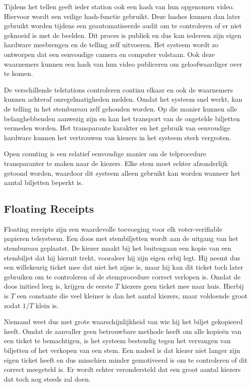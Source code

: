 \npar Tijdens het tellen geeft ieder station ook een hash van hun opgenomen video. Hiervoor wordt een veilige hash-functie gebruikt. Deze hashes kunnen dan later gebruikt worden tijdens een geautomatiseerde audit om te controleren of er niet geknoeid is met de beelden. Dit proces is publiek en dus kan iedereen zijn eigen hardware meebrengen en de telling zelf uitvoeren. Het systeem wordt zo ontworpen dat een eenvoudige camera en computer volstaan. Ook deze waarnemers kunnen een hash van hun video publiceren om geloofwaardiger over te komen.

\npar De verschillende telstations controleren continu elkaar en ook de waarnemers kunnen achteraf onregelmatigheden melden. Omdat het systeem snel werkt, kan de telling in het stembureau zelf gehouden worden. Op die manier kunnen alle belanghebbenden aanwezig zijn en kan het transport van de ongetelde biljetten vermeden worden. Het transparante karakter en het gebruik van eenvoudige hardware kunnen het vertrouwen van kiezers in het systeem sterk vergroten.

\npar Open counting is een relatief eenvoudige manier om de telprocedure transparanter te maken naar de kiezers. Elke stem moet echter afzonderlijk getoond worden, waardoor dit systeem alleen gebruikt kan worden wanneer het aantal biljetten beperkt is.

\subsection{Floating Receipts~\cite{rivest_smith_three_voting_protocols}}
\label{sec:ls:floating_receipts}

Floating receipts zijn een waardevolle toevoeging voor elk voter-verifiable papieren telsysteem. Een doos met stembiljetten wordt aan de uitgang van het stembureau geplaatst. De kiezer maakt bij het buitengaan een kopie van een stembiljet dat hij hieruit trekt, vooraleer hij zijn eigen erbij legt. Hij neemt dus een willekeurig ticket mee dat niet het zijne is, maar hij kan dit ticket toch later gebruiken om te controleren of de stemprocedure correct verlopen is. Omdat de doos initieel leeg is, krijgen de eerste $T$ kiezers geen ticket mee naar huis. Hierbij is $T$ een constante die veel kleiner is dan het aantal kiezers, maar voldoende groot zodat $1/T$ klein is.

\npar Niemand weet dus met grote waarschijnlijkheid van wie hij het biljet gekopieerd heeft. Omdat de aanvaller geen betrouwbare methode heeft om alle kopie\"en van een ticket te bemachtigen, is het systeem bestendig tegen het vervangen van biljetten of het verkopen van een stem. Een nadeel is dat kiezer niet langer zijn eigen ticket heeft en dus misschien minder gemotiveerd is om te controleren of dit correct meegeteld is. Er wordt echter verondersteld dat een groot aantal kiezers dat toch nog steeds zal doen.

